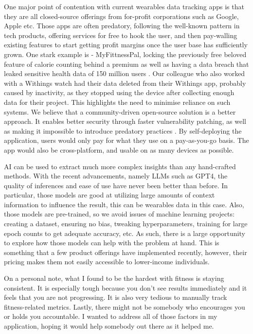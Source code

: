 One major point of contention with current wearables data tracking apps is that they are all closed-source offerings
 from for-profit corporations such as Google, Apple etc.
 Those apps are often predatory, following the well-known pattern in tech products, offering
 services for free to hook the user, and then pay-walling existing features to start getting profit margins once the user base has sufficiently grown. 
 One stark example is - MyFittnessPal, locking the previously free beloved feature of 
 calorie counting behind a premium \cite{myfitnesspalPaywall} as well as having a data breach that leaked sensitive health data of 150 million users \cite{myFitnessPalDataBreach}.
Our colleague who also worked with a Withings watch had their data deleted from their Withings app, probably caused by inactivity, as they stopped using the device after collecting enough data for their project. 
 This highlights the need to minimise reliance on such systems. We believe that a community-driven open-source solution is a better approach. 
 It enables better security through faster vulnerability patching, as well as making it impossible to introduce predatory practices \cite{openSourcePredatoryProtect}. By self-deploying the application, users would only pay for what they use on a pay-as-you-go basis. The app would also be cross-platform, and usable on as many devices as possible.

AI can be used to extract much more complex insights than any hand-crafted methods. With the recent advancements,
 namely LLMs such as GPT4, the quality of inferences and ease of use have never been better than before. In particular,
 those models are good at utilizing large amounts of context information to influence the result, this can be wearables data in this case. Also, those models are pre-trained, so we avoid issues of machine learning projects: creating a dataset, ensuring no bias, tweaking hyperparameters, training for large epoch counts to get adequate accuracy, etc.  As such, there is a large opportunity to explore how those models can help with the problem at hand. This is something that a few product offerings 
 have implemented recently, however, their pricing makes them not easily accessible to lower-income individuals. 

On a personal note, what I found to be the hardest with fitness is staying consistent. It is especially tough because you don't 
see results immediately and it feels that you are not progressing. It is also very tedious to manually track fitness-related metrics.
Lastly, there might not be somebody who encourages you or holds you accountable. I wanted to address all of those factors in my application, hoping it would help somebody out there as it helped me.


